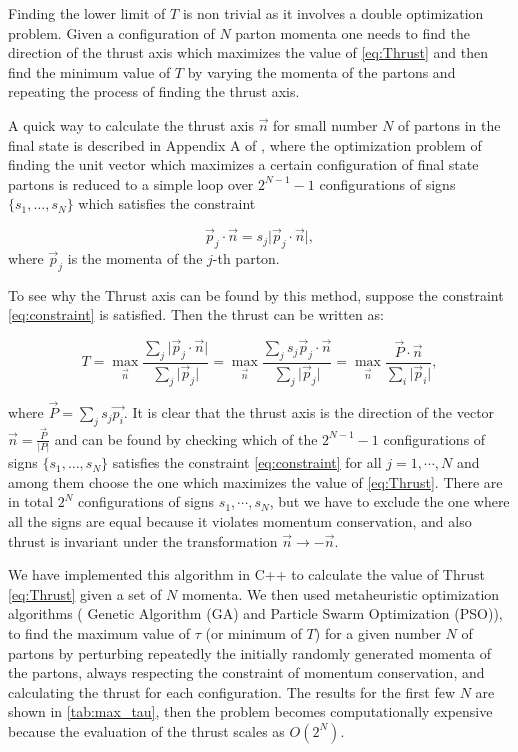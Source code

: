 \documentclass[../Tesi_Jiahao_Miao_986136.tex]{subfiles}
\begin{document}
Finding the lower limit of $T$ is non trivial as it involves a double optimization problem.  
Given a configuration of $N$ parton momenta one needs to find the direction of the thrust axis which maximizes the value of \cref{eq:Thrust}
and then find the minimum value of $T$ by varying the momenta of the partons and repeating the process of finding the thrust axis.

A quick way to calculate the thrust axis $\vec{n}$ for small number $N$ of partons in the final state is described 
in Appendix A of \cite{Weinzierl_2009}, where the optimization problem of finding the unit vector which maximizes a certain configuration of final state partons 
is reduced to a simple loop over $2^{N-1}-1$ configurations of signs $\{s_1,\dots,s_N\}$ which satisfies the constraint

\begin{equation}\label{eq:constraint}
    \vec{p}_j\cdot \vec{n} = s_j \vert \vec{p}_j\cdot \vec{n} \vert ,
\end{equation}
where $\vec{p}_j$ is the momenta of the $j$-th parton.

To see why the Thrust axis can be found by this method, suppose the constraint \cref{eq:constraint} is satisfied. Then the thrust can be written as: 

\begin{equation}
    T = \max_{\vec{n}} \frac{\sum_j \vert \vec{p}_j\cdot \vec{n} \vert}{\sum_j \vert \vec{p}_j \vert} = \max_{\vec{n}} \frac{\sum_j s_j \vec{p}_j\cdot \vec{n}}{\sum_j \vert \vec{p}_j \vert} = \max_{\vec{n}} \frac{\vec{P}\cdot \vec{n}}{\sum_i \vert \vec{p}_i \vert} ,
\end{equation} 

where $\vec{P}= \sum_j s_j \vec{p_i}$. It is clear that the thrust axis is the direction of the vector $\vec{n}=\frac{\vec{P}}{\vert P \vert}$ and 
can be found by checking which of the $2^{N-1}-1$ configurations of signs $\{s_1,\dots,s_N\}$ satisfies the constraint \cref{eq:constraint} for all $j= 1, \cdots , N$ and among 
them choose the one which maximizes the value of \cref{eq:Thrust}. There are in total $2^N$ configurations of signs $s_1, \cdots, s_N$, but we have to exclude the one where all the signs are equal because it violates momentum conservation, and also thrust 
is invariant under the transformation $\vec{n} \to -\vec{n}$.

We have implemented this algorithm in C++ to calculate the value of Thrust \cref{eq:Thrust} given a set of $N$ momenta. We then used metaheuristic optimization algorithms ( Genetic Algorithm (GA) and Particle Swarm Optimization (PSO)), 
to find the maximum value of $\tau$ (or minimum of $T$) for a given number $N$ of partons by perturbing repeatedly the initially randomly generated momenta of the partons, always respecting the constraint of momentum conservation, and calculating 
the thrust for each configuration. The results for the first few $N$ are shown in \cref{tab:max_tau}, then the problem 
becomes computationally expensive because the evaluation of the thrust scales as $O(2^N)$.
\end{document}
